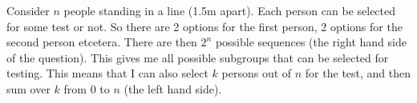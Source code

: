 
\setcounter{theorem}{14}
\begin{exercise}[BH.1.15]
	
\begin{solution}
	Consider $n$ people standing in a line (1.5m apart). Each person can be selected for some test or not. So there are 2 options for the first person, 2 options for the second person etcetera. There are then $2^n$ possible sequences (the right hand side of the question). This gives me all possible subgroups that can be selected for testing. This means that I can also select $k$ persons out of $n$ for the test, and then sum over $k$ from $0$ to $n$ (the left hand side).
\end{solution}
\end{exercise}


